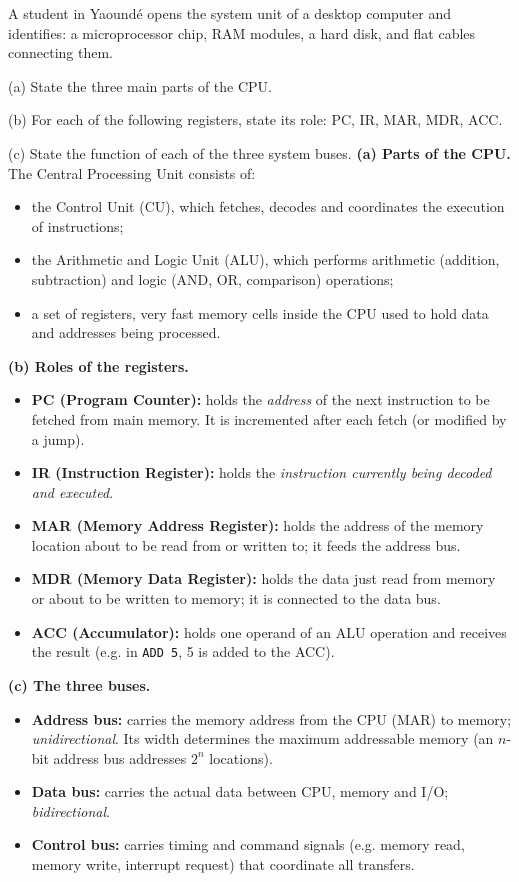 \documentclass[11pt]{article}
\newcommand{\cle}[1]{{\popxbold\color{popdark}#1}}
\begin{document}
\begin{exoresolu}
A student in Yaoundé opens the system unit of a desktop computer and identifies: a microprocessor chip, RAM modules, a hard disk, and flat cables connecting them.\par
(a) State the three main parts of the CPU.\par
(b) For each of the following registers, state its role: PC, IR, MAR, MDR, ACC.\par
(c) State the function of each of the three system buses.
\tcblower
\textbf{(a) Parts of the CPU.} The Central Processing Unit consists of:
\begin{itemize}
\item the \cle{Control Unit} (CU), which fetches, decodes and coordinates the execution of instructions;
\item the \cle{Arithmetic and Logic Unit} (ALU), which performs arithmetic (addition, subtraction) and logic (AND, OR, comparison) operations;
\item a set of \cle{registers}, very fast memory cells inside the CPU used to hold data and addresses being processed.
\end{itemize}
\textbf{(b) Roles of the registers.}
\begin{itemize}
\item \textbf{PC (Program Counter):} holds the \emph{address} of the next instruction to be fetched from main memory. It is incremented after each fetch (or modified by a jump).
\item \textbf{IR (Instruction Register):} holds the \emph{instruction currently being decoded and executed}.
\item \textbf{MAR (Memory Address Register):} holds the address of the memory location about to be read from or written to; it feeds the address bus.
\item \textbf{MDR (Memory Data Register):} holds the data just read from memory or about to be written to memory; it is connected to the data bus.
\item \textbf{ACC (Accumulator):} holds one operand of an ALU operation and receives the result (e.g. in \texttt{ADD 5}, 5 is added to the ACC).
\end{itemize}
\textbf{(c) The three buses.}
\begin{itemize}
\item \textbf{Address bus:} carries the memory address from the CPU (MAR) to memory; \emph{unidirectional}. Its width determines the maximum addressable memory (an $n$-bit address bus addresses $2^n$ locations).
\item \textbf{Data bus:} carries the actual data between CPU, memory and I/O; \emph{bidirectional}.
\item \textbf{Control bus:} carries timing and command signals (e.g. memory read, memory write, interrupt request) that coordinate all transfers.
\end{itemize}
\end{exoresolu}
\end{document}
